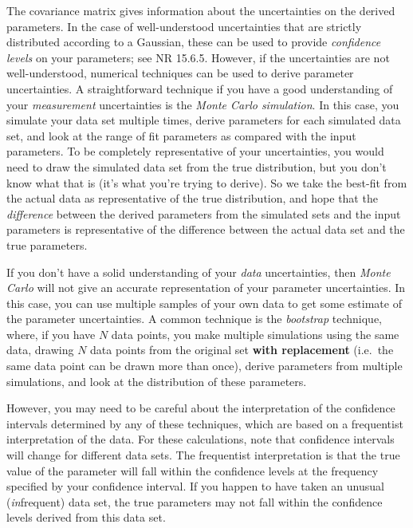 \documentclass[12pt]{article}
\begin{document}
The covariance matrix gives information about the uncertainties on
the derived parameters. In the case of well-understood uncertainties
that are strictly distributed according to a Gaussian, these can be
used to provide \emph{confidence levels} on your parameters;
see NR 15.6.5. However, if the uncertainties are not well-understood,
numerical techniques can be used to derive parameter uncertainties.
A straightforward technique if you have a good understanding of your
\emph{measurement} uncertainties is the \emph{Monte Carlo
simulation}. In this case, you simulate your data set multiple
times, derive parameters for each simulated data set, and look at
the range of fit parameters as compared with the input parameters.
To be completely representative of your uncertainties, you would
need to draw the simulated data set from the true distribution,
but you don't know what that is (it's what you're trying to derive).
So we take the best-fit from the actual data as representative of the
true distribution,
and hope that the \emph{difference} between the derived parameters
from the simulated sets and the input parameters is representative
of the difference between the actual data set and the true parameters.

If you don't have a solid understanding of your \emph{data}
uncertainties, then \emph{Monte Carlo} will not give an accurate
representation of your parameter uncertainties. In this case,
you can use multiple samples of your own data to get some estimate
of the parameter uncertainties. A common technique is the
\emph{bootstrap} technique, where, if you have $N$ data points,
you make multiple simulations using the same data, drawing $N$
data points from the original set \- \textbf{with replacement}
(i.e.\ the same data point can be drawn more than once), derive
parameters from multiple simulations, and look at the distribution
of these parameters.

However, you may need to be careful about the interpretation of the
confidence intervals determined by any of these techniques, which are
based on a frequentist interpretation of the data. For these
calculations, note that confidence intervals will change for different
data sets. The frequentist interpretation is that the true value
of the parameter will fall within the confidence levels at the
frequency specified by your confidence interval. If you happen
to have taken an unusual (\emph{in}frequent) data set, the true
parameters may not fall within the confidence levels derived from
this data set.
\end{document}

